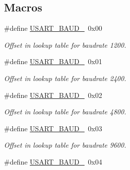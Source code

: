 \subsection*{Macros}
\begin{DoxyCompactItemize}
\item 
\hypertarget{group__usart__group_ga17a08f1046fbf3863708a2aa43431aee}{\#define \hyperlink{group__usart__group_ga17a08f1046fbf3863708a2aa43431aee}{U\-S\-A\-R\-T\-\_\-\-B\-A\-U\-D\-\_}~0x00}\label{group__usart__group_ga17a08f1046fbf3863708a2aa43431aee}

\begin{DoxyCompactList}\small\item\em Offset in lookup table for baudrate 1200. \end{DoxyCompactList}\item 
\hypertarget{group__usart__group_ga32eb31cede35bb0d6e8eb779f37a909c}{\#define \hyperlink{group__usart__group_ga32eb31cede35bb0d6e8eb779f37a909c}{U\-S\-A\-R\-T\-\_\-\-B\-A\-U\-D\-\_}~0x01}\label{group__usart__group_ga32eb31cede35bb0d6e8eb779f37a909c}

\begin{DoxyCompactList}\small\item\em Offset in lookup table for baudrate 2400. \end{DoxyCompactList}\item 
\hypertarget{group__usart__group_gabd9285f345ab5963144fa05a2f11ad95}{\#define \hyperlink{group__usart__group_gabd9285f345ab5963144fa05a2f11ad95}{U\-S\-A\-R\-T\-\_\-\-B\-A\-U\-D\-\_}~0x02}\label{group__usart__group_gabd9285f345ab5963144fa05a2f11ad95}

\begin{DoxyCompactList}\small\item\em Offset in lookup table for baudrate 4800. \end{DoxyCompactList}\item 
\hypertarget{group__usart__group_ga171993cfe2a9c29f38eb32ca5f3ea7cf}{\#define \hyperlink{group__usart__group_ga171993cfe2a9c29f38eb32ca5f3ea7cf}{U\-S\-A\-R\-T\-\_\-\-B\-A\-U\-D\-\_}~0x03}\label{group__usart__group_ga171993cfe2a9c29f38eb32ca5f3ea7cf}

\begin{DoxyCompactList}\small\item\em Offset in lookup table for baudrate 9600. \end{DoxyCompactList}\item 
\hypertarget{group__usart__group_gaa36d864b7756a910158a75cbd6854221}{\#define \hyperlink{group__usart__group_gaa36d864b7756a910158a75cbd6854221}{U\-S\-A\-R\-T\-\_\-\-B\-A\-U\-D\-\_}~0x04}\label{group__usart__group_gaa36d864b7756a910158a75cbd6854221}


\end{DoxyCompactItemize}
